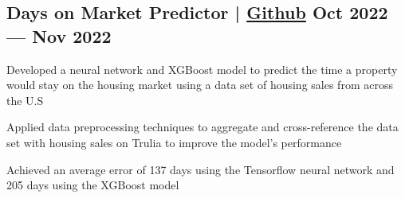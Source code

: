 \subsection{{Days on Market Predictor | \href{https://github.com/jerikjakobsen/Days-on-Market-Predictor}{Github} \hfill Oct 2022 --- Nov 2022}}
\begin{zitemize}
\item Developed a neural network and XGBoost model to predict the time a property would stay on the housing market using a data set of housing sales from across the U.S
\item Applied data preprocessing techniques to aggregate and cross-reference the data set with housing sales on Trulia to improve the model’s performance
\item Achieved an average error of 137 days using the Tensorflow neural network and 205 days using the XGBoost model
\end{zitemize}

